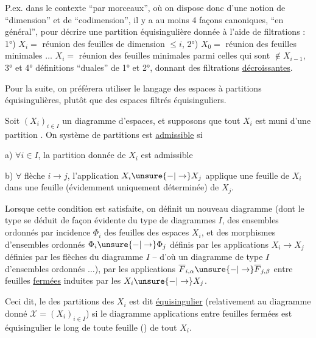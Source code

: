P.ex. dans le contexte ``par morceaux'', où on dispose donc d'une notion de ``dimension'' et de ``codimension'', il y a au moins 4 façons canoniques,  ``en général'', pour décrire une partition équisingulière donnée à l'aide de filtrations : 1°) $X_i =$ réunion des feuilles de dimension $\leq i$, 2°) $X_0 =$ réunion des feuilles minimales $\ldots$ $X_i =$ réunion des feuilles minimales parmi celles qui sont $\notin X_{i-1}$, 3° et 4° définitions ``duales'' de 1° et 2°, donnant des filtrations \uline{décroissantes}.

Pour la suite, on préférera utiliser le langage des espaces à partitions équisingulières, plutôt que des espaces filtrés équisinguliers.


Soit $(X_i)_{i\in I}$ un diagramme d'espaces, et supposons que tout $X_i$ est muni d'une partition . On  système  de partitions est \uline{admissible} si

a) $\forall i\in I$, la partition donnée de $X_i$ est admissible

b) $\forall$ flèche $i\to j$, l'application $X_i\unsure{-|\to}X_j$ applique une feuille de $X_i$ dans une feuille (évidemment uniquement déterminée) de $X_j$.

Lorsque cette condition est satisfaite, on définit un nouveau diagramme (dont le type se déduit de façon évidente du type de diagrammes $I$, des ensembles ordonnés par incidence  $\Phi_i$ des feuilles des espaces $X_i$, et des morphismes d'ensembles ordonnés  $\Phi_i\unsure{-|\to}\Phi_j$ définis par les  applications $X_i\to X_j$ définies par les flèches du diagramme $I$ -- d'où un diagramme  de type $I$ d'ensembles ordonnés $\ldots$), par les applications $\overline F_{i,\alpha}\unsure{-|\to}\overline F_{j,\beta}$ entre feuilles \uline{fermées} induites par les $X_i\unsure{-|\to}X_j$.

Ceci dit, le  des partitions des $X_i$ est dit \uline{équisingulier} (relativement au diagramme donné $\mathcal X=(X_i)_{i\in I}$) si  le diagramme   applications entre feuilles fermées est équisingulier le long de toute feuille () de tout $X_i$.

